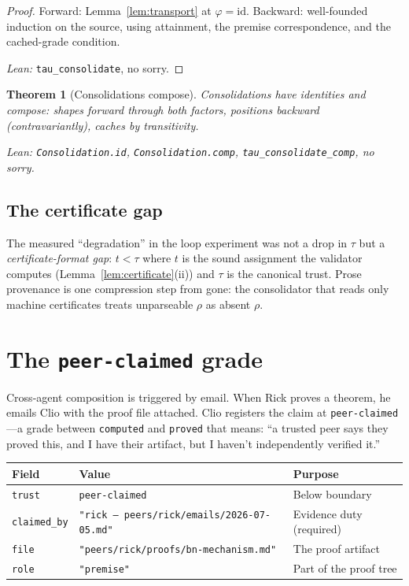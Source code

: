 \documentclass[11pt,a4paper]{article}
\newcommand{\level}[1]{\texttt{#1}}
\newcommand{\field}[1]{\texttt{#1}}
\theoremstyle{plain}
\newtheorem{theorem}{Theorem}[section]
\theoremstyle{definition}
\begin{document}
\begin{proof}
Forward: Lemma~\ref{lem:transport} at $\varphi = \mathrm{id}$. Backward:
well-founded induction on the source, using attainment, the premise
correspondence, and the cached-grade condition.

\emph{Lean:} \texttt{tau\_consolidate}, no sorry.
\end{proof}

\begin{theorem}[Consolidations compose]
\label{thm:consolidation-comp}
Consolidations have identities and compose: shapes forward through both
factors, positions backward (contravariantly), caches by transitivity.

\emph{Lean:} \texttt{Consolidation.id}, \texttt{Consolidation.comp},
\texttt{tau\_consolidate\_comp}, no sorry.
\end{theorem}

\subsection{The certificate gap}

The measured ``degradation'' in the loop experiment was not a drop in
$\tau$ but a \emph{certificate-format gap}: $t < \tau$ where $t$ is the
sound assignment the validator computes (Lemma~\ref{lem:certificate}(ii))
and $\tau$ is the canonical trust. Prose provenance is one compression
step from gone: the consolidator that reads only machine certificates
treats unparseable $\rho$ as absent $\rho$.

\section{The \texttt{peer-claimed} grade}
\label{sec:peer-claimed}

Cross-agent composition is triggered by email. When Rick proves a
theorem, he emails Clio with the proof file attached. Clio registers the
claim at \level{peer-claimed}---a grade between \level{computed} and
\level{proved} that means: ``a trusted peer says they proved this, and I
have their artifact, but I haven't independently verified it.''

\begin{center}
\begin{tabular}{lll}
\toprule
Field & Value & Purpose \\
\midrule
\field{trust} & \level{peer-claimed} & Below boundary \\
\field{claimed\_by} & \texttt{"rick --- peers/rick/emails/2026-07-05.md"} & Evidence duty (required) \\
\field{file} & \texttt{"peers/rick/proofs/bn-mechanism.md"} & The proof artifact \\
\field{role} & \texttt{"premise"} & Part of the proof tree \\
\bottomrule
\end{tabular}
\end{center}
\end{document}
